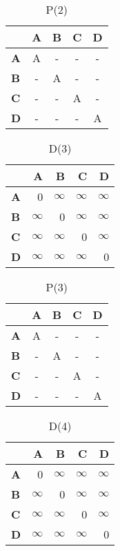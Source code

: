 \documentclass{article}
\newcommand{\INF}{$\infty$}
\begin{document}
\begin{table}[H]\centering
\caption{P(2)}
\begin{tabular}{l c c c c}
\toprule
 & \textbf{A} & \textbf{B} & \textbf{C} & \textbf{D}\\\midrule
\textbf{A} & A & - & - & - \\
\textbf{B} & - & A & - & - \\
\textbf{C} & - & - & A & - \\
\textbf{D} & - & - & - & A \\
\bottomrule
\end{tabular}
\end{table}

\begin{table}[H]\centering
\caption{D(3)}
\begin{tabular}{l r r r r}
\toprule
 & \textbf{A} & \textbf{B} & \textbf{C} & \textbf{D}\\\midrule
\textbf{A} & 0 & \INF & \INF & \INF \\
\textbf{B} & \INF & 0 & \INF & \INF \\
\textbf{C} & \INF & \INF & 0 & \INF \\
\textbf{D} & \INF & \INF & \INF & 0 \\
\bottomrule
\end{tabular}
\end{table}

\begin{table}[H]\centering
\caption{P(3)}
\begin{tabular}{l c c c c}
\toprule
 & \textbf{A} & \textbf{B} & \textbf{C} & \textbf{D}\\\midrule
\textbf{A} & A & - & - & - \\
\textbf{B} & - & A & - & - \\
\textbf{C} & - & - & A & - \\
\textbf{D} & - & - & - & A \\
\bottomrule
\end{tabular}
\end{table}

\begin{table}[H]\centering
\caption{D(4)}
\begin{tabular}{l r r r r}
\toprule
 & \textbf{A} & \textbf{B} & \textbf{C} & \textbf{D}\\\midrule
\textbf{A} & 0 & \INF & \INF & \INF \\
\textbf{B} & \INF & 0 & \INF & \INF \\
\textbf{C} & \INF & \INF & 0 & \INF \\
\textbf{D} & \INF & \INF & \INF & 0 \\
\bottomrule
\end{tabular}
\end{table}
\end{document}
